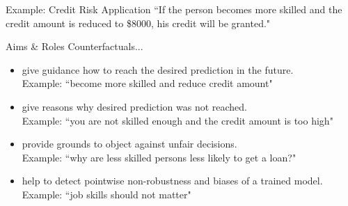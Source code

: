 \documentclass[11pt,compress,t,notes=noshow, xcolor=table]{beamer}
\begin{document}
\begin{vbframe}{Example: Credit Risk Application}
	``If the person becomes more skilled and the credit amount is reduced to \$8000, his credit will be granted."  \\[0.2cm]
	
\end{vbframe}


\begin{vbframe}{Aims \& Roles}
	Counterfactuals...
	\begin{itemize}
		\itemsep1.5em
		\item give guidance how to reach the desired prediction in the future.\\
		Example:  ``become more skilled and reduce credit amount"
		\item give reasons why desired prediction was not reached. \\
		Example:  ``you are not skilled enough and the credit amount is too high"
		\item provide grounds to object against unfair decisions. \\
		Example:  ``why are less skilled persons less likely to get a loan?"
		\item help to detect pointwise non-robustness and biases of a trained model. \\
		Example:  ``job skills should not matter" 
	\end{itemize}
\end{vbframe}
\end{document}
